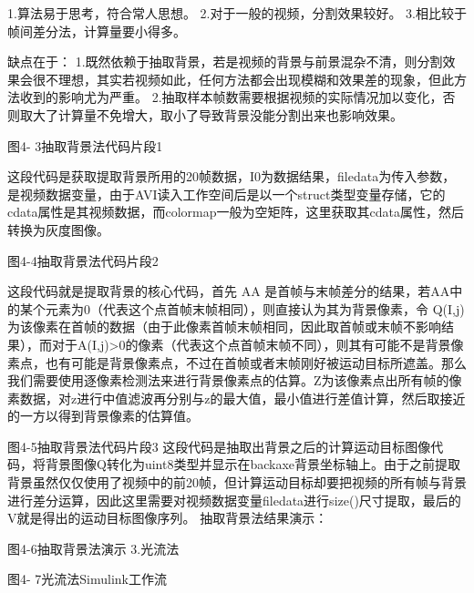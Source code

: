 \documentclass[18pt, twoside, a4paper, dvipdfm]{book}
\begin{document}
1.算法易于思考，符合常人思想。
2.对于一般的视频，分割效果较好。
3.相比较于帧间差分法，计算量要小得多。

缺点在于：
1.既然依赖于抽取背景，若是视频的背景与前景混杂不清，则分割效果会很不理想，其实若视频如此，任何方法都会出现模糊和效果差的现象，但此方法收到的影响尤为严重。
2.抽取样本帧数需要根据视频的实际情况加以变化，否则取大了计算量不免增大，取小了导致背景没能分割出来也影响效果。

 
 

图4- 3抽取背景法代码片段1

这段代码是获取提取背景所用的20帧数据，I0为数据结果，filedata为传入参数，是视频数据变量，由于AVI读入工作空间后是以一个struct类型变量存储，它的cdata属性是其视频数据，而colormap一般为空矩阵，这里获取其cdata属性，然后转换为灰度图像。
 

图4-4抽取背景法代码片段2

这段代码就是提取背景的核心代码，首先 AA 是首帧与末帧差分的结果，若AA中的某个元素为0（代表这个点首帧末帧相同），则直接认为其为背景像素，令 Q(I,j) 为该像素在首帧的数据（由于此像素首帧末帧相同，因此取首帧或末帧不影响结果），而对于A(I,j)>0的像素（代表这个点首帧末帧不同），则其有可能不是背景像素点，也有可能是背景像素点，不过在首帧或者末帧刚好被运动目标所遮盖。那么我们需要使用逐像素检测法来进行背景像素点的估算。Z为该像素点出所有帧的像素数据，对z进行中值滤波再分别与z的最大值，最小值进行差值计算，然后取接近的一方以得到背景像素的估算值。
 

图4-5抽取背景法代码片段3
这段代码是抽取出背景之后的计算运动目标图像代码，将背景图像Q转化为uint8类型并显示在backaxe背景坐标轴上。由于之前提取背景虽然仅仅使用了视频中的前20帧，但计算运动目标却要把视频的所有帧与背景进行差分运算，因此这里需要对视频数据变量filedata进行size()尺寸提取，最后的V就是得出的运动目标图像序列。
抽取背景法结果演示：
 

图4-6抽取背景法演示
3.光流法
 

图4- 7光流法Simulink工作流
\end{document}
